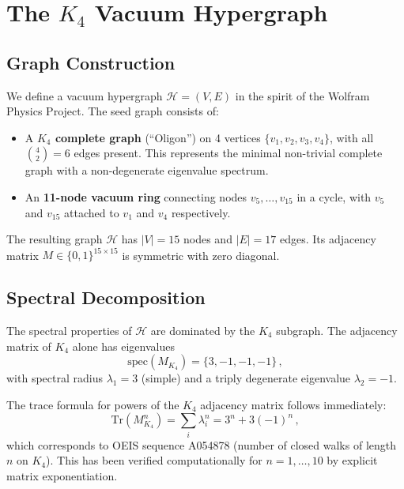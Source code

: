 \section{The $K_4$ Vacuum Hypergraph}
\label{sec:hypergraph_model}

\subsection{Graph Construction}

We define a vacuum hypergraph $\mathcal{H} = (V, E)$ in the spirit of the Wolfram Physics Project.  The seed graph consists of:
\begin{itemize}
    \item A \textbf{$K_4$ complete graph} (``Oligon'') on 4 vertices $\{v_1, v_2, v_3, v_4\}$, with all $\binom{4}{2} = 6$ edges present.  This represents the minimal non-trivial complete graph with a non-degenerate eigenvalue spectrum.
    \item An \textbf{11-node vacuum ring} connecting nodes $v_5, \ldots, v_{15}$ in a cycle, with $v_5$ and $v_{15}$ attached to $v_1$ and $v_4$ respectively.
\end{itemize}
The resulting graph $\mathcal{H}$ has $|V| = 15$ nodes and $|E| = 17$ edges.  Its adjacency matrix $M \in \{0,1\}^{15\times 15}$ is symmetric with zero diagonal.

\subsection{Spectral Decomposition}
\label{subsec:spectral}

The spectral properties of $\mathcal{H}$ are dominated by the $K_4$ subgraph.  The adjacency matrix of $K_4$ alone has eigenvalues
\begin{equation}
    \mathrm{spec}(M_{K_4}) = \{3, -1, -1, -1\}\,,
    \label{eq:K4_eigenvalues}
\end{equation}
with spectral radius $\lambda_1 = 3$ (simple) and a triply degenerate eigenvalue $\lambda_2 = -1$.

The trace formula for powers of the $K_4$ adjacency matrix follows immediately:
\begin{equation}
    \mathrm{Tr}(M_{K_4}^n) = \sum_{i} \lambda_i^n = 3^n + 3(-1)^n\,,
    \label{eq:trace_formula}
\end{equation}
which corresponds to OEIS sequence A054878 (number of closed walks of length $n$ on $K_4$).  This has been verified computationally for $n = 1, \ldots, 10$ by explicit matrix exponentiation.

